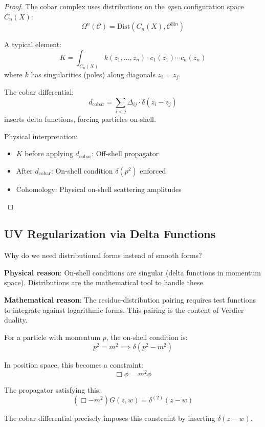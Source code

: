 \begin{proof}
The cobar complex uses distributions on the \emph{open} configuration space $C_n(X)$:
$$\Omega^n(\mathcal{C}) = \text{Dist}(C_n(X), \mathcal{C}^{\boxtimes n})$$

A typical element:
$$K = \int_{C_n(X)} k(z_1,\ldots,z_n) \cdot c_1(z_1) \cdots c_n(z_n)$$
where $k$ has singularities (poles) along diagonals $z_i = z_j$.

The cobar differential:
$$d_{\text{cobar}} = \sum_{i<j} \Delta_{ij} \cdot \delta(z_i-z_j)$$
inserts delta functions, forcing particles on-shell.

Physical interpretation:
\begin{itemize}
\item $K$ before applying $d_{\text{cobar}}$: Off-shell propagator
\item After $d_{\text{cobar}}$: On-shell condition $\delta(p^2)$ enforced
\item Cohomology: Physical on-shell scattering amplitudes
\end{itemize}
\end{proof}

\subsection{UV Regularization via Delta Functions}

\begin{remark}
Why do we need distributional forms instead of smooth forms?

\textbf{Physical reason}: On-shell conditions are singular (delta functions in 
momentum space). Distributions are the mathematical tool to handle these.

\textbf{Mathematical reason}: The residue-distribution pairing requires test 
functions to integrate against logarithmic forms. This pairing is the content of 
Verdier duality.
\end{remark}

\begin{example}
For a particle with momentum $p$, the on-shell condition is:
$$p^2 = m^2 \implies \delta(p^2 - m^2)$$

In position space, this becomes a constraint:
$$\Box \phi = m^2 \phi$$

The propagator satisfying this:
$$(\Box - m^2) G(z,w) = \delta^{(2)}(z-w)$$

The cobar differential precisely imposes this constraint by inserting 
$\delta(z-w)$.
\end{example}

